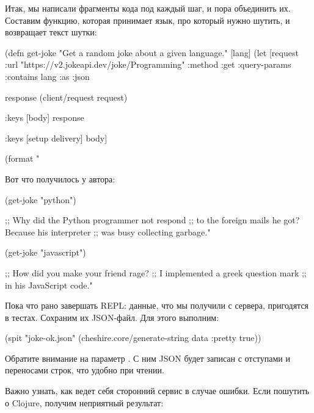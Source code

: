 Итак, мы написали фрагменты кода под каждый шаг, и пора объединить их. Составим функцию, которая принимает язык, про который нужно шутить, и возвращает текст шутки:

\begin{english}
  \begin{clojure}
(defn get-joke
  "Get a random joke about a given language."
  [lang]
  (let [request
        {:url "https://v2.jokeapi.dev/joke/Programming"
         :method :get
         :query-params {:contains lang}
         :as :json}

        response
        (client/request request)

        {:keys [body]}
        response

        {:keys [setup delivery]}
        body]

    (format "%
  \end{clojure}
\end{english}

Вот что получилось у автора:

\begin{english}
  \begin{clojure}
(get-joke "python")

;; Why did the Python programmer not respond
;; to the foreign mails he got? Because his interpreter
;; was busy collecting garbage."

(get-joke "javascript")

;; How did you make your friend rage?
;; I implemented a greek question mark
;; in his JavaScript code."
  \end{clojure}
\end{english}

Пока что рано завершать REPL: данные, что мы получили с сервера, пригодятся в тестах. Сохраним их JSON-файл. Для этого выполним:

\begin{english}
  \begin{clojure/lines}
(spit "joke-ok.json"
      (cheshire.core/generate-string
       data {:pretty true}))
  \end{clojure/lines}
\end{english}

Обратите внимание на параметр  . С ним JSON будет записан с отступами и переносами строк, что удобно при чтении.

Важно узнать, как ведет себя сторонний сервис в случае ошибки. Если пошутить о Clojure, получим неприятный результат:

